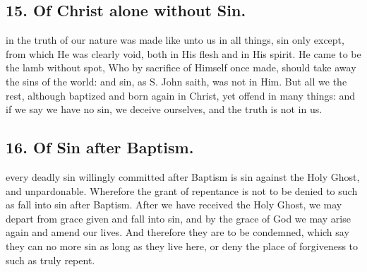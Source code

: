\newpage

\subsection{15. Of Christ alone without Sin.}
 in the truth of our nature was made like unto us in all things, sin only except, from which He was clearly void, both in His flesh and in His spirit. He came to be the lamb without spot, Who by sacrifice of Himself once made, should take away the sins of the world: and sin, as S. John saith, was not in Him. But all we the rest, although baptized and born again in Christ, yet offend in many things: and if we say we have no sin, we deceive ourselves, and the truth is not in us.

\subsection{16. Of Sin after Baptism.}
 every deadly sin willingly committed after Baptism is sin against the Holy Ghost, and unpardonable. Wherefore the grant of repentance is not to be denied to such as fall into sin after Baptism. After we have received the Holy Ghost, we may depart from grace given and fall into sin, and by the grace of God we may arise again and amend our lives. And therefore they are to be condemned, which say they can no more sin as long as they live here, or deny the place of forgiveness to such as truly repent.

